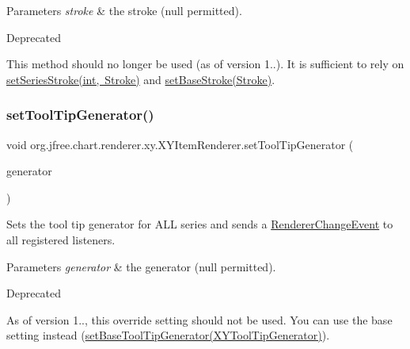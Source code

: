 \begin{DoxyParams}{Parameters}
{\em stroke} & the stroke ({\ttfamily null} permitted).\\
\hline
\end{DoxyParams}
\begin{DoxyRefDesc}{Deprecated}
\item[\mbox{\hyperlink{deprecated__deprecated000221}{Deprecated}}]This method should no longer be used (as of version 1..). It is sufficient to rely on \mbox{\hyperlink{interfaceorg_1_1jfree_1_1chart_1_1renderer_1_1xy_1_1_x_y_item_renderer_a177adecc8b87f936d6efcdd31bae876b}{set\+Series\+Stroke(int, Stroke)}} and \mbox{\hyperlink{interfaceorg_1_1jfree_1_1chart_1_1renderer_1_1xy_1_1_x_y_item_renderer_ab49f6dd93d5b994aea58be71e1f8c9b9}{set\+Base\+Stroke(\+Stroke)}}. \end{DoxyRefDesc}
\mbox{\label{interfaceorg_1_1jfree_1_1chart_1_1renderer_1_1xy_1_1_x_y_item_renderer_a66bfc42c0fe920c7eee1fc6c8c9ff066}} 
\subsubsection{\texorpdfstring{set\+Tool\+Tip\+Generator()}{setToolTipGenerator()}}
{\footnotesize\ttfamily void org.\+jfree.\+chart.\+renderer.\+xy.\+X\+Y\+Item\+Renderer.\+set\+Tool\+Tip\+Generator (\begin{DoxyParamCaption}\item[{\mbox{\hyperlink{interfaceorg_1_1jfree_1_1chart_1_1labels_1_1_x_y_tool_tip_generator}{X\+Y\+Tool\+Tip\+Generator}}}]{generator }\end{DoxyParamCaption})}

Sets the tool tip generator for A\+LL series and sends a \mbox{\hyperlink{}{Renderer\+Change\+Event}} to all registered listeners.


\begin{DoxyParams}{Parameters}
{\em generator} & the generator ({\ttfamily null} permitted).\\
\hline
\end{DoxyParams}
\begin{DoxyRefDesc}{Deprecated}
\item[\mbox{\hyperlink{deprecated__deprecated000228}{Deprecated}}]As of version 1.., this override setting should not be used. You can use the base setting instead (\mbox{\hyperlink{interfaceorg_1_1jfree_1_1chart_1_1renderer_1_1xy_1_1_x_y_item_renderer_ae53df47412e048dfb68cf0cdf578c394}{set\+Base\+Tool\+Tip\+Generator(\+X\+Y\+Tool\+Tip\+Generator)}}). \end{DoxyRefDesc}


